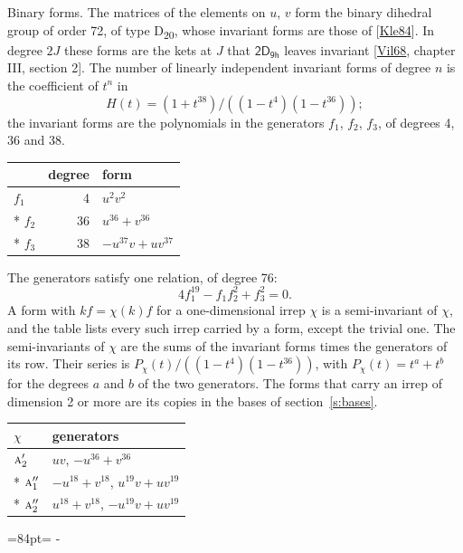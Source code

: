 \documentclass[10pt,a4paper]{article}
\makeatletter
\renewcommand\paragraph{\@startsection{paragraph}{4}{\z@}{1.5ex plus .5ex minus .2ex}{-1em}%
  {\normalfont\small\sffamily\bfseries\color{parttitle}}}
\newcommand{\needspace}[1]{\par\penalty-100\begingroup\dimen0=#1\relax\dimen2=\pagegoal
  \advance\dimen2-\pagetotal\ifdim\dimen0>\dimen2\relax\ifdim\dimen2>0pt\vfil\break\fi\fi
  \endgroup}
\numberwithin{equation}{section}
\newcommand{\grp}[1]{\mathsf{#1}}
\newcommand{\irr}[1]{\text{\normalfont\scshape #1}}
\makeatother
\begin{document}
\paragraph{Binary forms.}
The matrices of the elements on $u$, $v$ form the binary dihedral group of order 72, of type D\textsubscript{20}, whose invariant forms are those of [\href{../../../REFERENCES.pdf\#ref.Kle84}{Kle84}]. In degree $2J$ these forms are the kets at $J$ that $\grp{2D_{9h}}$ leaves invariant [\href{../../../REFERENCES.pdf\#ref.Vil68}{Vil68}, chapter III, section 2]. \label{n:head.degree}\label{n:head.form}The number of linearly independent invariant forms of degree $n$ is the coefficient of $t^n$ in
\begin{equation}\label{e:molien}H(t) = (1 + t^{38})/((1-t^{4})(1-t^{36}));\end{equation}
the invariant forms are the polynomials in the generators $f_1$, $f_2$, $f_3$, of degrees 4, 36 and 38.
{\small\begin{longtable}{@{}lrl@{}}\toprule
& degree & form\\\midrule\endhead
\bottomrule\endfoot\endlastfoot
$f_{1}$ & 4 & $u^{2}v^{2}$\\*
$f_{2}$ & 36 & $u^{36} + v^{36}$\\*
$f_{3}$ & 38 & $-u^{37}v + uv^{37}$\\
\bottomrule\end{longtable}}
The generators satisfy one relation, of degree 76:
\begin{equation}\label{e:relation}4f_{1}^{19} - f_{1}f_{2}^{2} + f_{3}^{2} = 0.\end{equation}
A form with $k f = \chi(k) f$ for a one-dimensional irrep $\chi$ is a semi-invariant of $\chi$, and the table lists every such irrep carried by a form, except the trivial one. \label{n:head.generators}The semi-invariants of $\chi$ are the sums of the invariant forms times the generators of its row. Their series is $P_\chi(t)/((1-t^{4})(1-t^{36}))$, with $P_\chi(t) = t^{a} + t^{b}$ for the degrees $a$ and $b$ of the two generators. The forms that carry an irrep of dimension 2 or more are its copies in the bases of section~\ref{s:bases}.
{\small\begin{longtable}{@{}ll@{}}\toprule
$\chi$ & generators\\\midrule\endhead
\bottomrule\endfoot\endlastfoot
$\irr{a}_{2}'$ & $uv$, $-u^{36} + v^{36}$\\*
$\irr{a}_{1}''$ & $-u^{18} + v^{18}$, $u^{19}v + uv^{19}$\\*
$\irr{a}_{2}''$ & $u^{18} + v^{18}$, $-u^{19}v + uv^{19}$\\
\bottomrule\end{longtable}}
\needspace{84pt}
\end{document}
